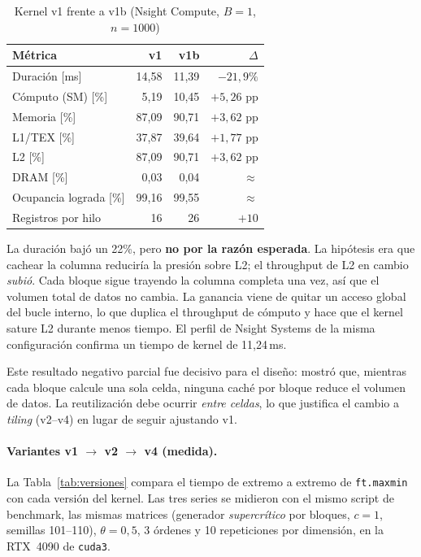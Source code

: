\documentclass[11pt,a4paper]{article}
\begin{document}
\begin{table}[h]
\centering
\caption{Kernel v1 frente a v1b (Nsight Compute, $B=1$, $n=\num{1000}$)}\label{tab:v1b}
\begin{tabular}{lrrr}
\toprule
\textbf{Métrica} & \textbf{v1} & \textbf{v1b} & \textbf{$\Delta$}\\
\midrule
Duración [ms]                 & 14,58 & 11,39 & $-21{,}9\%$\\
Cómputo (SM) [\%]             & 5,19  & 10,45 & $+5{,}26$ pp\\
Memoria [\%]                  & 87,09 & 90,71 & $+3{,}62$ pp\\
L1/TEX [\%]                   & 37,87 & 39,64 & $+1{,}77$ pp\\
L2 [\%]                       & 87,09 & 90,71 & $+3{,}62$ pp\\
DRAM [\%]                     & 0,03  & 0,04  & $\approx$\\
Ocupancia lograda [\%]        & 99,16 & 99,55 & $\approx$\\
Registros por hilo            & 16    & 26    & $+10$\\
\bottomrule
\end{tabular}
\end{table}

La duración bajó un 22\%, pero \textbf{no por la razón esperada}. La hipótesis era que
cachear la columna reduciría la presión sobre L2; el throughput de L2 en cambio
\emph{subió}. Cada bloque sigue trayendo la columna completa una vez, así que el volumen total
de datos no cambia. La ganancia viene de quitar un acceso global del bucle interno, lo que
duplica el throughput de cómputo y hace que el kernel sature L2 durante menos tiempo. El
perfil de Nsight Systems de la misma configuración confirma un tiempo de kernel de 11,24\,ms.

Este resultado negativo parcial fue decisivo para el diseño: mostró que, mientras cada
bloque calcule una sola celda, ninguna caché por bloque reduce el volumen de datos. La
reutilización debe ocurrir \emph{entre celdas}, lo que justifica el cambio a \emph{tiling}
(v2--v4) en lugar de seguir ajustando v1.

\paragraph{Variantes v1 $\rightarrow$ v2 $\rightarrow$ v4 (medida).}
La Tabla~\ref{tab:versiones} compara el tiempo de extremo a extremo de \texttt{ft.maxmin} con
cada versión del kernel. Las tres series se midieron con el mismo script
de benchmark, las mismas matrices (generador \emph{supercrítico} por bloques,
$c=1$, semillas 101--110), $\theta=0{,}5$, 3 órdenes y 10 repeticiones por dimensión, en la
RTX~4090 de \texttt{cuda3}.
\end{document}
